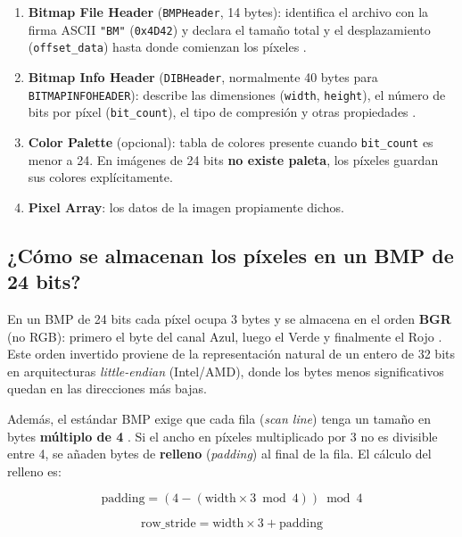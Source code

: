 \documentclass[12pt, letterpaper]{article}
\begin{document}
\begin{enumerate}
    \item \textbf{Bitmap File Header} (\texttt{BMPHeader}, 14 bytes): identifica el archivo con la firma ASCII \texttt{"BM"} (\texttt{0x4D42}) y declara el tamaño total y el desplazamiento (\texttt{offset\_data}) hasta donde comienzan los píxeles \cite{fileformat_bmp}.
    \item \textbf{Bitmap Info Header} (\texttt{DIBHeader}, normalmente 40 bytes para \texttt{BITMAPINFOHEADER}): describe las dimensiones (\texttt{width}, \texttt{height}), el número de bits por píxel (\texttt{bit\_count}), el tipo de compresión y otras propiedades \cite{microsoft_bitmapinfoheader}.
    \item \textbf{Color Palette} (opcional): tabla de colores presente cuando \texttt{bit\_count} es menor a 24. En imágenes de 24 bits \textbf{no existe paleta}, los píxeles guardan sus colores explícitamente.
    \item \textbf{Pixel Array}: los datos de la imagen propiamente dichos.
\end{enumerate}

\subsection*{¿Cómo se almacenan los píxeles en un BMP de 24 bits?}

En un BMP de 24 bits cada píxel ocupa 3 bytes y se almacena en el orden \textbf{BGR} (no RGB): primero el byte del canal Azul, luego el Verde y finalmente el Rojo \cite{fileformat_bmp}. Este orden invertido proviene de la representación natural de un entero de 32 bits en arquitecturas \textit{little-endian} (Intel/AMD), donde los bytes menos significativos quedan en las direcciones más bajas.

Además, el estándar BMP exige que cada fila (\textit{scan line}) tenga un tamaño en bytes \textbf{múltiplo de 4} \cite{microsoft_bitmapinfo}. Si el ancho en píxeles multiplicado por 3 no es divisible entre 4, se añaden bytes de \textbf{relleno} (\textit{padding}) al final de la fila. El cálculo del relleno es:

\begin{equation}
    \text{padding} = (4 - (\text{width} \times 3 \bmod 4)) \bmod 4
\end{equation}

\begin{equation}
    \text{row\_stride} = \text{width} \times 3 + \text{padding}
\end{equation}
\end{document}

